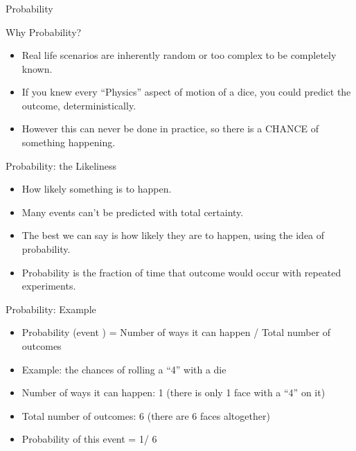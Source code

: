 \begin{frame}[fragile]\frametitle{}
\begin{center}
{\Large Probability}
\end{center}
\end{frame}

\begin{frame}{Why Probability?}
\begin{itemize}
\item Real life scenarios are inherently random or too complex to be completely known. 
\item If you knew every ``Physics'' aspect of motion of a dice, you could predict the outcome, deterministically.
\item However this can never be done in practice, so there is a CHANCE of something happening.
\end{itemize}
\end{frame}

\begin{frame}{Probability: the Likeliness}
\begin{itemize}
\item How likely something is to happen. 
\item Many events can't be predicted with total certainty. 
\item The best we can say is how likely they are to happen, using the idea of probability. 
\item Probability is the fraction of time that outcome would occur with repeated experiments.
\end{itemize}
\end{frame}

\begin{frame}{Probability: Example}
\begin{itemize}
\item Probability (event ) = Number of ways it can happen / Total number of 
outcomes 
\item Example: the chances of rolling a ``4'' with a die 
\item Number of ways it can happen: 1 (there is only 1 face with a ``4'' on it) 
\item Total number of outcomes: 6 (there are 6 faces altogether) 
 \item Probability of  this event  = 1/ 6 
\end{itemize}
\end{frame}

